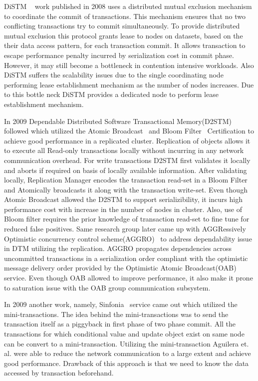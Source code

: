\documentclass[12pt,english]{report}
\begin{document}
DiSTM ~\cite{Kotselidis08distm:a} work published in 2008 uses a distributed mutual exclusion mechanism to coordinate the commit of transactions. This mechanism ensures that no two conflicting transactions try to commit simultaneously. To provide distributed mutual exclusion this protocol grants lease to nodes on datasets, based on the their data access pattern, for each transaction commit. It allows transaction to escape performance penalty incurred by serialization cost in commit phase. However, it may still become a bottleneck in contention intensive workloads. Also DiSTM suffers the scalability issues due to the single coordinating node performing lease establishment mechanism as the number of nodes increases. Due to this bottle neck DiSTM provides a dedicated node to perform lease establishment mechanism.

In 2009 Dependable Distributed Software Transactional Memory(D2STM)~\cite{D2STM:5368778} followed which utilized the Atomic Broadcast~\cite{Defago:2004:TOB:1041680.1041682} and Bloom Filter~\cite{Bloom:1970:STH:362686.362692} Certification to achieve good performance in a replicated cluster. Replication of objects allows it to execute all Read-only transactions locally without incurring in any network communication overhead. For write transactions D2STM first validates it locally and aborts if required on basis of locally available information. After validating locally, Replication Manager encodes the transaction read-set in a Bloom Filter and Atomically broadcasts it along with the transaction write-set. Even though Atomic Broadcast allowed the D2STM to support serializibility, it incurs high performance cost with increase in the number of nodes in cluster. Also, use of Bloom filter requires the prior knowledge of transaction read-set to fine tune for reduced false positives. Same research group later came up with AGGRessively Optimistic concurrency control scheme(AGGRO)~\cite{AGGRO:5598236} to address dependability issue in DTM utilizing the replication. AGGRO propagates dependencies across uncommitted transactions in a serialization order compliant with the optimistic message delivery order provided by the Optimistic Atomic Broadcast(OAB)~\cite{OAB:Pedone200379} service. Even though OAB allowed to improve performance, it also make it prone to saturation issue with the OAB group communication subsystem.  

In 2009 another work, namely, Sinfonia~\cite{Aguilera:2009:SNP:1629087.1629088} service came out which utilized the mini-transactions. The idea behind the mini-transactions was to send the transaction itself as a piggyback in first phase of two phase commit. All the transactions for which conditional value and update object exist on same node can be convert to a mini-transaction. Utilizing the mini-transaction Aguilera et. al. were able to reduce the network communication to a large extent and achieve good performance. Drawback of this approach is that we need to know the data accessed by transaction beforehand.
\end{document}
